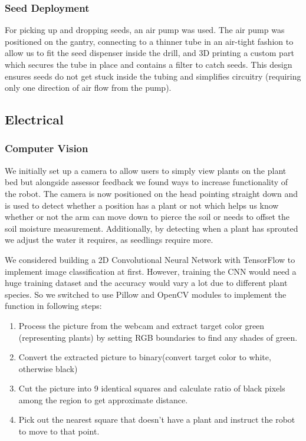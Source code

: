 \documentclass{article}
\begin{document}
\subsubsection{Seed Deployment}
For picking up and dropping seeds, an air pump was used. The air pump was positioned on the gantry, connecting to a thinner tube in an air-tight fashion to allow us to fit the seed dispenser inside the drill, and 3D printing a custom part which secures the tube in place and contains a filter to catch seeds. This design ensures seeds do not get stuck inside the tubing and simplifies circuitry (requiring only one direction of air flow from the pump). 

\subsection{Electrical}

\subsubsection{Computer Vision}

We initially set up a camera to allow users to simply view plants on the plant bed but alongside assessor feedback we found ways to increase functionality of the robot. The camera is now positioned on the head pointing straight down and is used to detect whether a position has a plant or not  which helps us know whether or not the arm can move down to pierce the soil or needs to offset the soil moisture measurement. Additionally, by detecting when a plant has sprouted we adjust the water it requires, as seedlings require more.

We considered building a 2D Convolutional Neural Network with TensorFlow \cite{TF} to implement image classification at first. However, training the CNN would need a huge training dataset and the accuracy would vary a lot due to different plant species. So we switched to use Pillow \cite{Pillow} and OpenCV \cite{opencv_library} modules to implement the function in following steps:

\begin{enumerate}
    \vspace{-2mm}
    \item Process the picture from the webcam and extract target color green (representing plants) by setting RGB boundaries to find any shades of green.
    \item Convert the extracted picture to binary(convert target color to white, otherwise black)
    \item Cut the picture into 9 identical squares and calculate ratio of black pixels among the region to get approximate distance.
    \item Pick out the nearest square that doesn't have a plant and instruct the robot to move to that point.
    \vspace{-1mm}
\end{enumerate}
\end{document}
